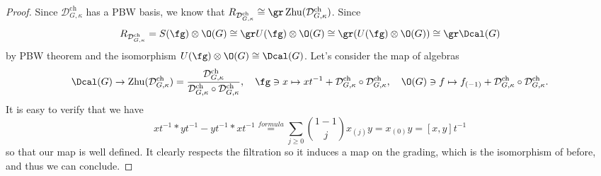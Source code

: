 \documentclass[a4paper, 10pt]{article}
\newcommand{\Dc}{ \mathcal{D}^{\mathrm{ch}}_{G, \kappa} }         %
\DeclareMathOperator{\Zhu}{ Zhu}                             %
\begin{document}
        \begin{proof}
            Since $\Dc$ has a PBW basis, we know that $R_{\Dc} \cong \gr \Zhu(\Dc)$. Since \[R_{\Dc} = S(\fg) \otimes \O(G) \cong \gr U(\fg) \otimes \O(G) \cong \gr(U(\fg) \otimes \O(G)) \cong \gr \Dcal(G) \] by PBW theorem and the isomorphism $U(\fg) \otimes \O(G) \cong \Dcal(G)$. Let's consider the map of algebras \[\Dcal(G) \to \Zhu(\Dc) = \frac{\Dc}{\Dc \circ \Dc}, \quad \fg \ni x \mapsto xt^{-1} + \Dc \circ \Dc, \quad \O(G) \ni f \mapsto f_{(-1)} + \Dc \circ \Dc.\] It is easy to verify that we have 
            \[ xt^{-1} * yt^{-1} - yt^{-1} * xt^{-1} \stackrel{formula}{=} \sum_{j \geq 0 } \binom{1-1}{j} x_{(j)}y = x_{(0)}y = [x,y]t^{-1}   \] so that our map is well defined. It clearly respects the filtration so it induces a map on the grading, which is the isomorphism of before, and thus we can conclude.
        \end{proof}

        \printbibliography
\end{document}
